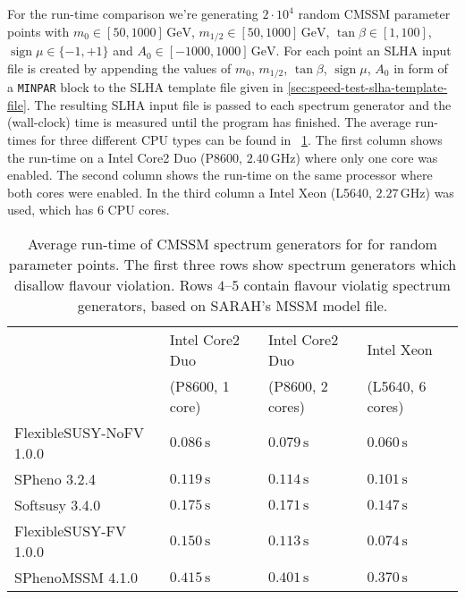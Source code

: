 \documentclass[final,3p,11pt,pdflatex]{elsarticle}
\newcommand{\code}[1]{\lstinline|#1|}  %
\newcommand{\unit}[1]{\,\text{#1}}      %
\newcommand{\tabref}[1]{\tablename~\ref{#1}}
\DeclareMathOperator{\sign}{sign}
\begin{document}
For the run-time comparison we're generating $2\cdot 10^{4}$ random
CMSSM parameter points with $m_0\in [50,1000]\unit{GeV}$, $m_{1/2}\in
[50,1000]\unit{GeV}$, $\tan\beta\in [1,100]$, $\sign\mu\in \{-1,+1\}$
and $A_0\in [-1000,1000]\unit{GeV}$.  For each point an SLHA input
file is created by appending the values of $m_0$, $m_{1/2}$,
$\tan\beta$, $\sign\mu$, $A_0$ in form of a \code{MINPAR} block to the
SLHA template file given in \ref{sec:speed-test-slha-template-file}.
The resulting SLHA input file is passed to each spectrum generator and
the (wall-clock) time is measured until the program has finished.  The
average run-times for three different CPU types can be found in
\tabref{tab:run-time-comparison}.  The first column shows the run-time
on a Intel Core2 Duo (P8600, $2.40\unit{GHz}$) where only one core was
enabled.  The second column shows the run-time on the same processor
where both cores were enabled.  In the third column a Intel Xeon
(L5640, $2.27\unit{GHz}$) was used, which has $6$ CPU cores.
%
\begin{table}[tbh]
  \centering
  \begin{tabular}{llll}
    \toprule
                            & Intel Core2 Duo    & Intel Core2 Duo   & Intel Xeon\\
                            & (P8600, 1 core)    & (P8600, 2 cores)  & (L5640, 6 cores)\\
    \midrule
    FlexibleSUSY-NoFV 1.0.0 & $0.086\unit{s}$    & $0.079\unit{s}$   & $0.060\unit{s}$\\
    SPheno 3.2.4            & $0.119\unit{s}$    & $0.114\unit{s}$   & $0.101\unit{s}$\\
    Softsusy 3.4.0          & $0.175\unit{s}$    & $0.171\unit{s}$   & $0.147\unit{s}$\\
    \midrule
    FlexibleSUSY-FV 1.0.0   & $0.150\unit{s}$    & $0.113\unit{s}$   & $0.074\unit{s}$\\
    SPhenoMSSM 4.1.0        & $0.415\unit{s}$    & $0.401\unit{s}$   & $0.370\unit{s}$\\
    \bottomrule
  \end{tabular}
  \caption{Average run-time of CMSSM spectrum generators for
    for random parameter points.  The first three rows show
    spectrum generators which disallow flavour violation.  Rows
    $4$--$5$ contain flavour violatig spectrum generators, based
    on SARAH's MSSM model file.}
  \label{tab:run-time-comparison}
\end{table}
\end{document}
